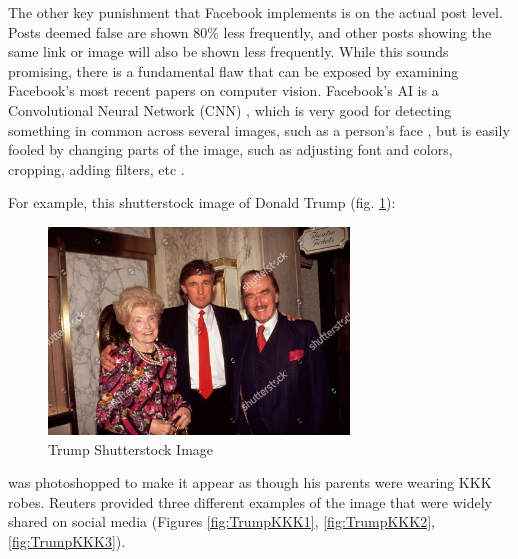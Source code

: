 \documentclass[preprint,review,12pt]{elsarticle}
\begin{document}
The other key punishment that Facebook implements is on the actual post level. Posts deemed false are shown 80\% less frequently, and other posts showing the same link or image will also be shown less frequently. While this sounds promising, there is a fundamental flaw that can be exposed by examining Facebook's most recent papers on computer vision. Facebook's AI is a Convolutional Neural Network (CNN) \cite{carion2020end}, which is very good for detecting something in common across several images, such as a person's face \cite{kalinovskii2015compact}, but is easily fooled by changing parts of the image, such as adjusting font and colors, cropping, adding filters, etc \cite{sumbaly2020using}.

For example, this shutterstock image of Donald Trump (fig. \ref{fig:Trump Shutterstock Image}): 
 \begin{figure}[htp]
    \centering
    \includegraphics[width=8cm]{trumpkkk0.jpg}
    \caption{Trump Shutterstock Image}
    \label{fig:Trump Shutterstock Image}
\end{figure}

was photoshopped to make it appear as though his parents were wearing KKK robes. Reuters provided three different examples of the image that were widely shared on social media \cite{reuters2020trump} (Figures \ref{fig:TrumpKKK1}, \ref{fig:TrumpKKK2}, \ref{fig:TrumpKKK3}).
\end{document}

